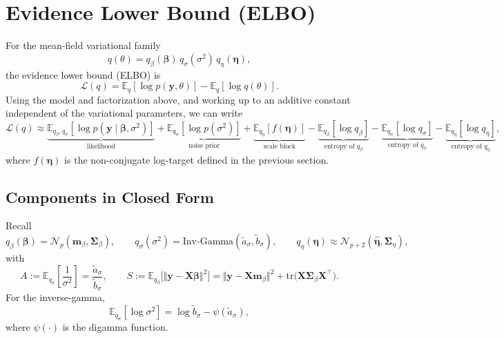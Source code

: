 \documentclass[11pt]{article}
\newcommand{\vect}[1]{\boldsymbol{#1}}
\newcommand{\mat}[1]{\mathbf{#1}}
\newcommand{\E}{\mathbb{E}}
\newcommand{\IG}{\mathrm{Inv\text{-}Gamma}}
\newcommand{\N}{\mathcal{N}}
\begin{document}
\section{Evidence Lower Bound (ELBO)}

For the mean-field variational family
\[
  q(\theta) = q_\beta(\vect{\beta})\,q_\sigma(\sigma^2)\,q_\eta(\vect{\eta}),
\]
the evidence lower bound (ELBO) is
\begin{equation}
  \mathcal{L}(q)
  = \E_q[\log p(\vect{y},\theta)] - \E_q[\log q(\theta)].
\end{equation}
Using the model and factorization above, and working up to an additive constant independent of the variational parameters, we can write
\begin{equation}
  \mathcal{L}(q)
  \approx
  \underbrace{\E_{q_\beta,q_\sigma}[\log p(\vect{y}\mid\vect{\beta},\sigma^2)]}_{\text{likelihood}}
  + \underbrace{\E_{q_\sigma}[\log p(\sigma^2)]}_{\text{noise prior}}
  + \underbrace{\E_{q_\eta}[f(\vect{\eta})]}_{\text{scale block}}
  - \underbrace{\E_{q_\beta}[\log q_\beta]}_{\text{entropy of }q_\beta}
  - \underbrace{\E_{q_\sigma}[\log q_\sigma]}_{\text{entropy of }q_\sigma}
  - \underbrace{\E_{q_\eta}[\log q_\eta]}_{\text{entropy of }q_\eta},
\end{equation}
where $f(\vect{\eta})$ is the non-conjugate log-target defined in the previous section.

\subsection*{Components in Closed Form}

Recall
\[
  q_\beta(\vect{\beta}) = \N_p(\vect{m}_\beta,\mat{\Sigma}_\beta),
  \qquad
  q_\sigma(\sigma^2) = \IG(\tilde a_\sigma,\tilde b_\sigma),
  \qquad
  q_\eta(\vect{\eta}) \approx \N_{p+2}(\hat{\vect{\eta}},\mat{\Sigma}_\eta),
\]
with
\begin{equation}
  A := \E_{q_\sigma}\!\left[\frac{1}{\sigma^2}\right]
  = \frac{\tilde a_\sigma}{\tilde b_\sigma},
  \qquad
  S := \E_{q_\beta}\big[\Vert \vect{y} - \mat{X}\vect{\beta}\Vert^2\big]
  = \Vert \vect{y} - \mat{X}\vect{m}_\beta\Vert^2
  + \mathrm{tr}\big(\mat{X}\mat{\Sigma}_\beta\mat{X}^\top\big).
\end{equation}
For the inverse-gamma,
\begin{equation}
  \E_{q_\sigma}[\log \sigma^2] = \log \tilde b_\sigma - \psi(\tilde a_\sigma),
\end{equation}
where $\psi(\cdot)$ is the digamma function.
\end{document}
